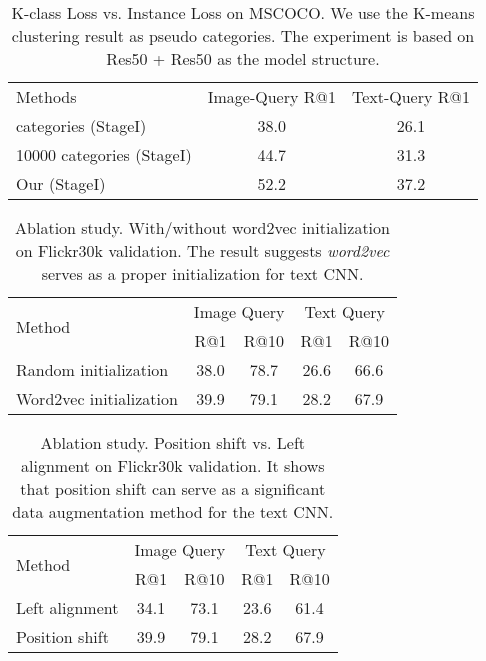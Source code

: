 \documentclass[10pt,final,journal]{IEEEtran}
\begin{document}
\setlength{\tabcolsep}{7pt}
\begin{table}
\footnotesize
\begin{center}
\begin{tabular}{l|c|c}
\hline
Methods  &Image-Query R@1 &Text-Query R@1\\
\shline
3000 categories (StageI)  & 38.0 & 26.1 \\
10000 categories (StageI)  & 44.7 & 31.3 \\
Our (StageI)  & 52.2 & 37.2 \\
\hline
\end{tabular}
\end{center}
\caption{K-class Loss vs. Instance Loss on MSCOCO. We use the K-means clustering result as pseudo categories. The experiment is based on Res50 + Res50 as the model structure.}
\label{table:R1}
\end{table}

\setlength{\tabcolsep}{7pt}
\begin{table}
\footnotesize
\begin{center}
\begin{tabular}{l|cc|cc}
\hline
\multirow{2}{*}{Method} & \multicolumn{2}{c|}{Image Query} & \multicolumn{2}{c}{Text Query}\\
  & R@1 & R@10 & R@1 & R@10\\
\shline
Random initialization \cite{glorot2010understanding} & 38.0 & 78.7 & 26.6 & 66.6 \\
Word2vec initialization & 39.9 & 79.1 & 28.2 & 67.9 \\
\hline
\end{tabular}
\end{center}
\caption{Ablation study. With/without word2vec initialization on Flickr30k validation. 
The result suggests \emph{word2vec} serves as a proper initialization for text CNN.
}
\label{table:Word2vec}
\end{table}

\setlength{\tabcolsep}{10pt}
\begin{table}
\footnotesize
\begin{center}
\begin{tabular}{l|cc|cc}
\hline
\multirow{2}{*}{Method} & \multicolumn{2}{c|}{Image Query} & \multicolumn{2}{c}{Text Query}\\
  & R@1 & R@10 & R@1 & R@10\\
\shline
Left alignment & 34.1 & 73.1 & 23.6 & 61.4 \\
Position shift & 39.9 & 79.1 & 28.2 & 67.9 \\
\hline
\end{tabular}
\end{center}
\caption{Ablation study. Position shift vs. Left alignment on Flickr30k validation. 
It shows that position shift can serve as a significant data augmentation method for the text CNN.
}
\label{table:Position shift}
\end{table}
\end{document}
